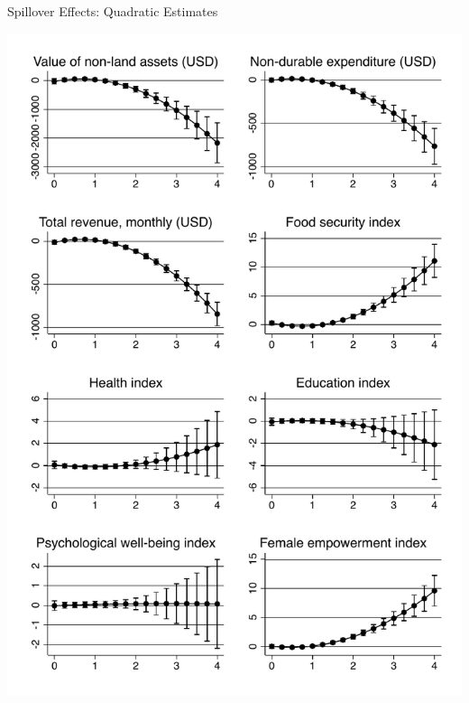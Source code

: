 \documentclass[14pt, aspectratio=169]{beamer}
\begin{document}
\begin{frame}{Spillover Effects: Quadratic Estimates}

\centering
\begin{minipage}{.48\linewidth}
    \includegraphics[height=0.66\textheight, trim={0 10cm 0 0}, clip]{../Figs/indices_ppp_margins.pdf}


\end{minipage}
\end{frame}
\end{document}
